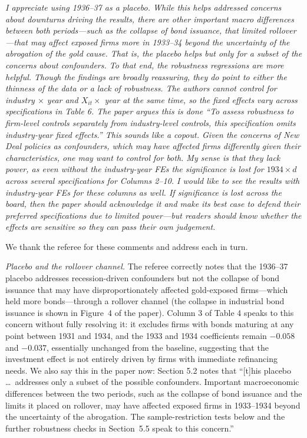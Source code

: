 \noindent \textit{\textcolor{red!60!black}{
I appreciate using 1936--37 as a placebo. While this helps addressed concerns about downturns driving the results, there are other important macro differences between both periods---such as the collapse of bond issuance, that limited rollover---that may affect exposed firms more in 1933--34 beyond the uncertainty of the abrogation of the gold cause. That is, the placebo helps but only for a subset of the concerns about confounders. To that end, the robustness regressions are more helpful. Though the findings are broadly reassuring, they do point to either the thinness of the data or a lack of robustness. The authors cannot control for industry $\times$ year and $X_{it} \times$ year at the same time, so the fixed effects vary across specifications in Table 6. The paper argues this is done ``To assess robustness to firm-level controls separately from industry-level controls, this specification omits industry-year fixed effects.'' This sounds like a copout. Given the concerns of New Deal policies as confounders, which may have affected firms differently given their characteristics, one may want to control for both. My sense is that they lack power, as even without the industry-year FEs the significance is lost for $1934 \times d$ across several specifications for Columns 2--10. I would like to see the results with industry-year FEs for these columns as well. If significance is lost across the board, then the paper should acknowledge it and make its best case to defend their preferred specifications due to limited power---but readers should know whether the effects are sensitive so they can pass their own judgement.
}}

\bigskip

\noindent We thank the referee for these comments and address each in turn.

\medskip
\noindent \textit{Placebo and the rollover channel.} The referee correctly notes that the 1936--37 placebo addresses recession-driven confounders but not the collapse of bond issuance that may have disproportionately affected gold-exposed firms---which held more bonds---through a rollover channel (the collapse in industrial bond issuance is shown in Figure~4 of the paper). Column 3 of Table 4 speaks to this concern without fully resolving it: it excludes firms with bonds maturing at any point between 1931 and 1934, and the 1933 and 1934 coefficients remain $-0.058$ and $-0.037$, essentially unchanged from the baseline, suggesting that the investment effect is not entirely driven by firms with immediate refinancing needs. We also say this in the paper now: Section 5.2 notes that ``[t]his placebo \ldots\ addresses only a subset of the possible confounders. Important macroeconomic differences between the two periods, such as the collapse of bond issuance and the limits it placed on rollover, may have affected exposed firms in 1933--1934 beyond the uncertainty of the abrogation. The sample-restriction tests below and the further robustness checks in Section~5.5 speak to this concern.''

